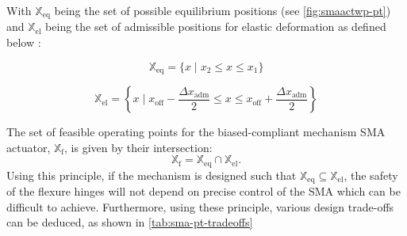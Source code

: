 With $\mathbb{X}_\text{eq}$ being the set of possible equilibrium positions (see \cref{fig:smaactwp-pt}) and $\mathbb{X}_\text{el}$ being the set of admissible positions for elastic deformation as defined below :

\begin{equation}\label{eq:X_eq}
    \mathbb{X}_\text{eq} = \{ x \;|\;  x_{2}\leqslant x \leqslant x_{1}\}
\end{equation}

\begin{equation}\label{eq:X_adm}
    \mathbb{X}_\text{el} =  \left\{ x \; | \; x_\text{off} - \frac{\Delta x_{\text{adm}}}{2} \leqslant x \leqslant x_\text{off} + \frac{\Delta x_{\text{adm}}}{2} \right\}
\end{equation}

The set of feasible operating points for the biased-compliant mechanism SMA actuator, $\mathbb{X}_\text{f}$, is given by their intersection:
\begin{equation}
   \mathbb{X}_\text{f} = \mathbb{X}_\text{eq} \cap \mathbb{X}_\text{el}.
\end{equation}
Using this principle, if the mechanism is designed such that  $\mathbb{X}_\text{eq} \subseteq \mathbb{X}_\text{el}$, the safety of the flexure hinges will not depend on precise control of the SMA which can be difficult to achieve. Furthermore, using these principle, various design trade-offs can be deduced, as shown in \cref{tab:sma-pt-tradeoffs}

\renewcommand{\arraystretch}{1.5} %

